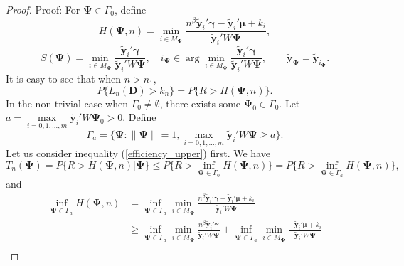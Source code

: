 \documentclass[final,11pt,3p]{article}\usepackage{setspace}
\begin{document}
\begin{proof}{Proof:}
For $\boldsymbol{\Psi} \in \Gamma_0 $, define
\begin{equation*}
H(\boldsymbol{\Psi}, n) = \min_{i \in M_{\boldsymbol{\Psi}}} \frac{n^{\beta} \tilde{\boldsymbol{y}}_i'\boldsymbol{\gamma} -  \tilde{\boldsymbol{y}}_i'\boldsymbol{\mu} + k_i}{ \tilde{\boldsymbol{y}}_i' W \boldsymbol{\Psi}},
\end{equation*}
\begin{equation*}
S(\boldsymbol{\Psi}) = \min_{i \in M_{\boldsymbol{\Psi}}} \frac{ \tilde{\boldsymbol{y}}_i'\boldsymbol{\gamma} }{ \tilde{\boldsymbol{y}}_i' W \boldsymbol{\Psi}}, \quad
i_{\boldsymbol{\Psi}} \in \arg \min _{i \in M_{\boldsymbol{\Psi}}} \frac{ \tilde{\boldsymbol{y}}_i'\boldsymbol{\gamma} }{ \tilde{\boldsymbol{y}}_i' W \boldsymbol{\Psi}},\quad
\quad \tilde{\boldsymbol{y}}_{\boldsymbol{\Psi}} = \tilde{\boldsymbol{y}}_{i_{\boldsymbol{\Psi} } }.
\end{equation*}
It is easy to see that when $n > n_1 $,
\begin{equation}\label{Ln}
{P}\{L_n(\boldsymbol{D})> k_n \} = {P}\{ R > H(\boldsymbol{\Psi}, n)\}.
\end{equation}
In the non-trivial case when $\Gamma_0 \ne \emptyset$, there exists some $\boldsymbol{\Psi}_0 \in \Gamma_0$. Let $a = \max\limits_{i=0,1,\dots,m}  \tilde{\boldsymbol{y}}_i' W \boldsymbol{\Psi}_0 > 0$.
Define
\begin{equation*}
\Gamma_a = \{\boldsymbol{\Psi}: \|\boldsymbol{\Psi}\|=1, \max\limits_{i=0,1,\dots,m}  \tilde{\boldsymbol{y}}_i' W \boldsymbol{\Psi} \ge a \}.
\end{equation*}
Let us consider inequality (\ref{efficiency_upper}) first. We have
\begin{equation*}
T_n(\boldsymbol{\Psi}) = {P}\{ R > H(\boldsymbol{\Psi}, n)| \boldsymbol{\Psi} \} \le {P}\{ R > \inf_{ \boldsymbol{\Psi} \in \Gamma_0 } H(\boldsymbol{\Psi}, n)\} = {P}\{ R > \inf_{ \boldsymbol{\Psi} \in \Gamma_a } H(\boldsymbol{\Psi}, n)\},
\end{equation*}
and
\begin{align*}
\inf_{\boldsymbol{\Psi} \in \Gamma_a}  H(\boldsymbol{\Psi}, n) & = \inf_{\boldsymbol{\Psi} \in \Gamma_a} \min_{i \in M_{\boldsymbol{\Psi}}} \frac{n^{\beta} \tilde{\boldsymbol{y}}_i'\boldsymbol{\gamma} - \tilde{\boldsymbol{y}}_i'\boldsymbol{\mu}  + k_i}{ \tilde{\boldsymbol{y}}_i' W \boldsymbol{\Psi}}\\
& \ge  \inf_{\boldsymbol{\Psi} \in \Gamma_a} \min_{i \in M_{\boldsymbol{\Psi}}} \frac{n^{\beta} \tilde{\boldsymbol{y}}_i'\boldsymbol{\gamma} }{ \tilde{\boldsymbol{y}}_i' W \boldsymbol{\Psi}} + \inf_{\boldsymbol{\Psi} \in \Gamma_a} \min_{i \in M_{\boldsymbol{\Psi}}} \frac{-  \tilde{\boldsymbol{y}}_i'\boldsymbol{\mu}  + k_i}{ \tilde{\boldsymbol{y}}_i' W \boldsymbol{\Psi}}\\

\end{align*}
\end{proof}
\end{document}
